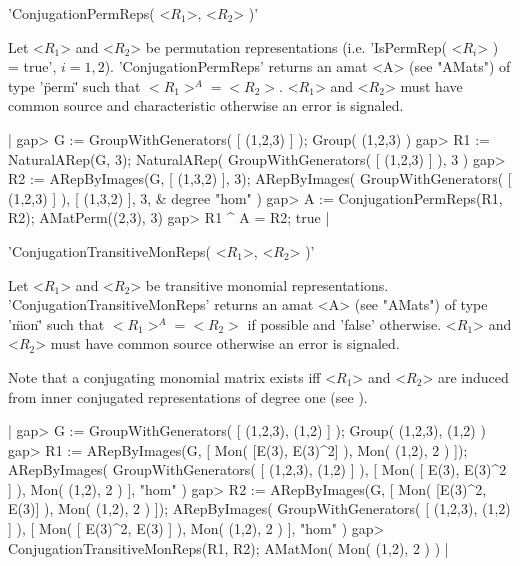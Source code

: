 
'ConjugationPermReps( <$R_1$>, <$R_2$> )'

Let <$R_1$> and <$R_2$> be permutation representations (i.e. 
'IsPermRep( <$R_i$> ) = true', $i = 1,2$).
'ConjugationPermReps' returns an amat <A>
(see "AMats") of type '\"perm\"' such that $<R_1>^A = <R_2>$.
<$R_1$> and <$R_2$> must have common source and characteristic 
otherwise an error is signaled.

|    gap> G := GroupWithGenerators( [ (1,2,3) ] );
    Group( (1,2,3) )
    gap> R1 := NaturalARep(G, 3);
    NaturalARep( GroupWithGenerators( [ (1,2,3) ] ), 3 )
    gap> R2 := ARepByImages(G, [ (1,3,2) ], 3);
    ARepByImages(
      GroupWithGenerators( [ (1,2,3) ] ),
      [ (1,3,2)
      ],
      3, & degree
      "hom"
    )
    gap> A := ConjugationPermReps(R1, R2);
    AMatPerm((2,3), 3) 
    gap> R1 ^ A = R2;
    true |


'ConjugationTransitiveMonReps( <$R_1$>, <$R_2$> )'

Let <$R_1$> and <$R_2$> be transitive monomial representations.
'ConjugationTransitiveMonReps' returns an amat <A>
(see "AMats") of type '\"mon\"' such that $<R_1>^A = <R_2>$ 
if possible and 'false' otherwise.
<$R_1$> and <$R_2$> must have common source 
otherwise an error is signaled.

Note that a conjugating monomial matrix exists iff <$R_1$> and <$R_2$> 
are induced from inner conjugated representations of degree one
(see \cite{Pue98}).

|    gap> G := GroupWithGenerators( [ (1,2,3), (1,2) ] );
    Group( (1,2,3), (1,2) )
    gap> R1 := ARepByImages(G, [ Mon( [E(3), E(3)^2] ), Mon( (1,2), 2 ) ]);
    ARepByImages(
      GroupWithGenerators( [ (1,2,3), (1,2) ] ),
      [ Mon( [ E(3), E(3)^2 ] ),
        Mon( (1,2), 2 )
      ],
      "hom"
    )
    gap> R2 := ARepByImages(G, [ Mon( [E(3)^2, E(3)] ), Mon( (1,2), 2 ) ]);  
    ARepByImages(
      GroupWithGenerators( [ (1,2,3), (1,2) ] ),
      [ Mon( [ E(3)^2, E(3) ] ),
        Mon( (1,2), 2 )
      ],
      "hom"
    )
    gap> ConjugationTransitiveMonReps(R1, R2);
    AMatMon( Mon( (1,2), 2 ) ) |


